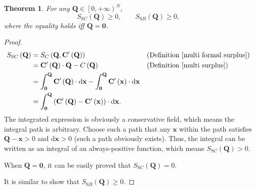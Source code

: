 \documentclass{article}
\newtheorem{theorem}{Theorem}[subsection]
\begin{document}
\begin{theorem}
For any $\mathbf Q\in\left[0,+\infty\right)^N$,
$$S_{\mathrm SC}\left(\mathbf Q\right)\ge0,
\qquad S_{\mathrm SB}\left(\mathbf Q\right)\ge0,$$
where the equality holds iff $\mathbf Q=\mathbf0$.
\end{theorem}
\begin{proof}
\begin{align*}
S_{\mathrm SC}\left(\mathbf Q\right)&=S_C\left(\mathbf Q,\mathbf C'\left(\mathbf Q\right)\right)&&\text{(Definition \ref{multi formal surplus})}\\
&=\mathbf C'\left(\mathbf Q\right)\cdot\mathbf Q-C\left(\mathbf Q\right)&&\text{(Definition \ref{multi surplus})}\\
&=\int_\mathbf0^\mathbf Q\mathbf C'\left(\mathbf Q\right)\cdot\mathrm d\mathbf x-\int_\mathbf0^\mathbf Q\mathbf C'\left(\mathbf x\right)\cdot\mathrm d\mathbf x\\
&=\int_\mathbf0^\mathbf Q\left(\mathbf C'\left(\mathbf Q\right)-\mathbf C'\left(\mathbf x\right)\right)\cdot\mathrm d\mathbf x.
\end{align*}
The integrated expression is obviously a conservative field, which means the integral path is arbitrary.
Choose such a path that any $\mathbf x$ within the path satisfies $\mathbf Q-\mathbf x>0$ and $\mathrm d\mathbf x>0$ (such a path obviously exists).
Thus, the integral can be written as an integral of an always-positive function, which means $S_{\mathrm SC}\left(\mathbf Q\right)>0$.

When $\mathbf Q=\mathbf0$, it can be easily proved that $S_{\mathrm SC}\left(\mathbf Q\right)=0$.

It is similar to show that $S_{\mathrm SB}\left(\mathbf Q\right)\ge0$.
\end{proof}
\end{document}
